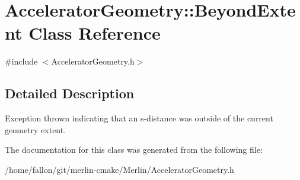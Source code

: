 \hypertarget{classAcceleratorGeometry_1_1BeyondExtent}{}\section{Accelerator\+Geometry\+:\+:Beyond\+Extent Class Reference}
\label{classAcceleratorGeometry_1_1BeyondExtent}


{\ttfamily \#include $<$Accelerator\+Geometry.\+h$>$}



\subsection{Detailed Description}
Exception thrown indicating that an s-\/distance was outside of the current geometry extent. 

The documentation for this class was generated from the following file\+:\begin{DoxyCompactItemize}
\item 
/home/fallon/git/merlin-\/cmake/\+Merlin/Accelerator\+Geometry.\+h\end{DoxyCompactItemize}
